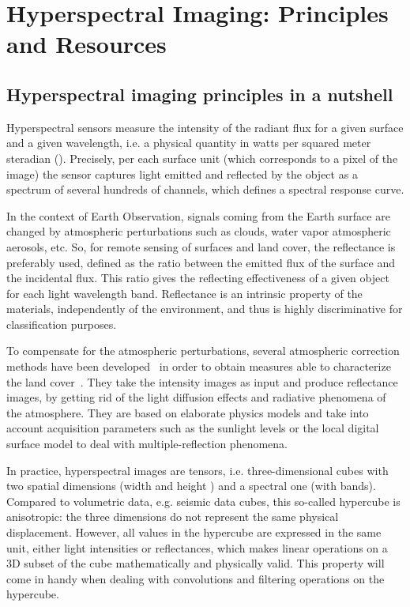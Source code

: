 \documentclass[journal]{IEEEtran}
\begin{document}
\section{Hyperspectral Imaging: Principles and Resources}


\subsection{Hyperspectral imaging principles in a nutshell}




Hyperspectral sensors measure the intensity of the radiant flux for a given surface and a given wavelength, i.e. a physical quantity in watts per squared meter steradian (). Precisely, per each surface unit (which corresponds to a pixel of the image) the sensor captures light emitted and reflected by the object as a spectrum of several hundreds of channels, which defines a spectral response curve. 






In the context of Earth Observation, signals coming from the Earth surface are changed by atmospheric perturbations such as clouds, water vapor atmospheric aerosols, etc. So, for remote sensing of surfaces and land cover, the reflectance is preferably used, defined as the ratio between the emitted flux of the surface and the incidental flux. This ratio gives the reflecting effectiveness of a given object for each light wavelength band. Reflectance is an intrinsic property of the materials, independently of the environment, and thus is highly discriminative for classification purposes.

To compensate for the atmospheric perturbations, several atmospheric correction methods have been developed~\cite{deschamps_atmospheric_1980,rahman_smac:_1994,chavez_image-based_1996} in order to obtain measures able to characterize the land cover~\cite{gao_atmospheric_2009}. They take the intensity images as input and produce reflectance images, by getting rid of the light diffusion effects and radiative phenomena of the atmosphere. They are based on elaborate physics models and take into account acquisition parameters such as the sunlight levels or the local digital surface model to deal with multiple-reflection phenomena.

In practice, hyperspectral images are  tensors, i.e. three-dimensional cubes with two spatial dimensions (width  and height ) and a spectral one (with  bands). Compared to volumetric data, e.g. seismic data cubes, this so-called hypercube is anisotropic: the three dimensions do not represent the same physical displacement. However, all values in the hypercube are expressed in the same unit, either light intensities or reflectances, which makes linear operations on a 3D subset of the cube mathematically and physically valid. This property will come in handy when dealing with convolutions and filtering operations on the hypercube.
\end{document}
